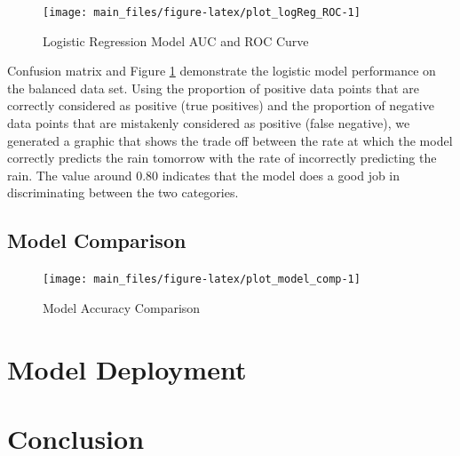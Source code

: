 \begin{Schunk}
\begin{figure}[H]

{\centering \texttt{[image: main\_files/figure-latex/plot\_logReg\_ROC-1]} 

}

\caption[Logistic Regression Model AUC and ROC Curve]{Logistic Regression Model AUC and ROC Curve}\label{fig:plot_logReg_ROC}
\end{figure}
\end{Schunk}

Confusion matrix and Figure \ref{fig:plot_logReg_ROC} demonstrate the
logistic model performance on the balanced data set. Using the
proportion of positive data points that are correctly considered as
positive (true positives) and the proportion of negative data points
that are mistakenly considered as positive (false negative), we
generated a graphic that shows the trade off between the rate at which
the model correctly predicts the rain tomorrow with the rate of
incorrectly predicting the rain. The value around 0.80 indicates that
the model does a good job in discriminating between the two categories.

\hypertarget{model-comparison}{%
\subsection{Model Comparison}\label{model-comparison}}

\begin{Schunk}
\begin{figure}[H]

{\centering \texttt{[image: main\_files/figure-latex/plot\_model\_comp-1]} 

}

\caption[Model Accuracy Comparison]{Model Accuracy Comparison}\label{fig:plot_model_comp}
\end{figure}
\end{Schunk}

\hypertarget{model-deployment}{%
\section{Model Deployment}\label{model-deployment}}

\hypertarget{conclusion}{%
\section{Conclusion}\label{conclusion}}

